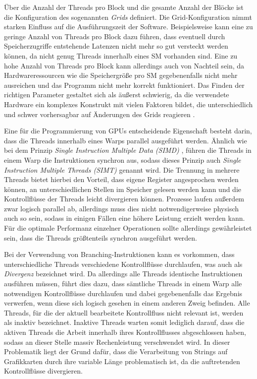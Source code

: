 Über die Anzahl der Threads pro Block und die gesamte Anzahl der Blöcke ist die Konfiguration des sogenannten \emph{Grids} definiert.
Die Grid-Konfiguration nimmt starken Einfluss auf die Ausführungszeit der Software.
Beispielsweise kann eine zu geringe Anzahl von Threads pro Block dazu führen, dass eventuell durch Speicherzugriffe entstehende Latenzen nicht mehr so gut versteckt werden können, da nicht genug Threads innerhalb eines SM vorhanden sind.
Eine zu hohe Anzahl von Threads pro Block kann allerdings auch von Nachteil sein, da Hardwareressourcen wie die Speichergröße pro SM gegebenenfalls nicht mehr ausreichen und das Programm nicht mehr korrekt funktioniert.
Das Finden der richtigen Parameter gestaltet sich als äußerst schwierig, da die verwendete Hardware ein komplexes Konstrukt mit vielen Faktoren bildet, die unterschiedlich und schwer vorhersagbar auf Änderungen des Grids reagieren \cite{Wong2010}.

Eine für die Programmierung von GPUs entscheidende Eigenschaft besteht darin, dass die Threads innerhalb eines Warps parallel ausgeführt werden.
Ähnlich wie bei dem Prinzip \emph{Single Instruction Multiple Data (SIMD)} \cite{Pohl2016}, führen die Threads in einem Warp die Instruktionen synchron aus, sodass dieses Prinzip auch \emph{Single Instruction Multiple Threads (SIMT)} genannt wird.
Die Trennung in mehrere Threads bietet hierbei den Vorteil, dass eigene Register angesprochen werden können, an unterschiedlichen Stellen im Speicher gelesen werden kann und die Kontrollflüsse der Threads leicht divergieren können.
Prozesse laufen außerdem zwar logisch parallel ab, allerdings muss dies nicht notwendigerweise physisch auch so sein, sodass in einigen Fällen eine höhere Leistung erzielt werden kann.
Für die optimale Performanz einzelner Operationen sollte allerdings gewährleistet sein, dass die Threads größtenteils synchron ausgeführt werden.

Bei der Verwendung von Branching-Instruktionen kann es vorkommen, dass unterschiedliche Threads verschiedene Kontrollflüsse durchlaufen, was auch als \emph{Divergenz} bezeichnet wird.
Da allerdings alle Threads identische Instruktionen ausführen müssen, führt dies dazu, dass sämtliche Threads in einem Warp alle notwendigen Kontrollflüsse durchlaufen und dabei gegebenenfalls das Ergebnis verwerfen, wenn diese sich logisch gesehen in einem anderen Zweig befinden.
Alle Threads, für die der aktuell bearbeitete Kontrollfluss nicht relevant ist, werden als inaktiv bezeichnet.
Inaktive Threads warten somit lediglich darauf, dass die aktiven Threads die Arbeit innerhalb ihres Kontrollflusses abgeschlossen haben, sodass an dieser Stelle massiv Rechenleistung verschwendet wird.
In dieser Problematik liegt der Grund dafür, dass die Verarbeitung von Strings auf Grafikkarten durch ihre variable Länge problematisch ist, da die auftretenden Kontrollflüsse divergieren.

